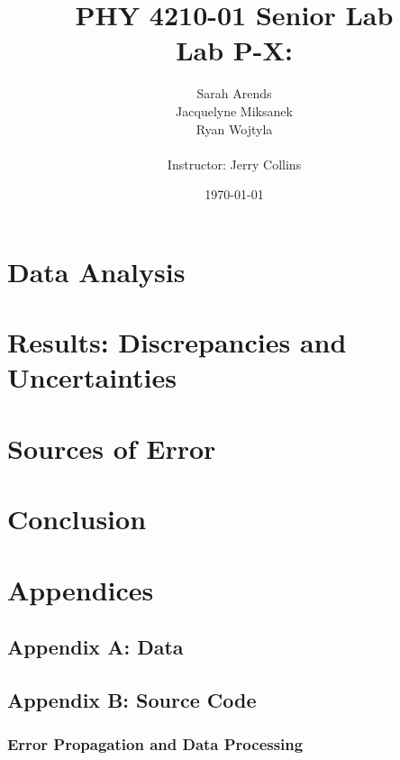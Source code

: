 \documentclass[a4paper]{article}
\title{PHY 4210-01 Senior Lab \\Lab P-X:}
\author{Sarah Arends \\
        Jacquelyne Miksanek \\
        Ryan Wojtyla \\ \\
        Instructor: Jerry Collins}
\date{\today}
\begin{document}
\maketitle

\begin{abstract}

\qq 

\end{abstract}

\newpage

\tableofcontents

\newpage

\section{Data Analysis}

\begin{figure}[H]
\centering
\label{labelname}
\end{figure}

\section{Results: Discrepancies and Uncertainties}

\section{Sources of Error}
\qq 

\section{Conclusion}
\qq 

\section{Appendices}

\subsection{Appendix A: Data}

\subsection{Appendix B: Source Code}

\subsubsection{Error Propagation and Data Processing}
\end{document}
